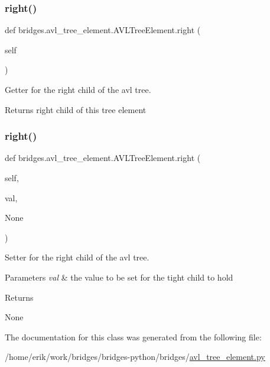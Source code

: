 \subsubsection{\texorpdfstring{right()}{right()}\hspace{0.1cm}{\footnotesize\ttfamily [1/2]}}
{\footnotesize\ttfamily def bridges.\+avl\+\_\+tree\+\_\+element.\+A\+V\+L\+Tree\+Element.\+right (\begin{DoxyParamCaption}\item[{}]{self }\end{DoxyParamCaption})}



Getter for the right child of the avl tree. 

\begin{DoxyReturn}{Returns}
right child of this tree element 
\end{DoxyReturn}
\mbox{\label{classbridges_1_1avl__tree__element_1_1_a_v_l_tree_element_ad9b5962ea5c89c9b91d7767b1b258c8e}} 
\subsubsection{\texorpdfstring{right()}{right()}\hspace{0.1cm}{\footnotesize\ttfamily [2/2]}}
{\footnotesize\ttfamily def bridges.\+avl\+\_\+tree\+\_\+element.\+A\+V\+L\+Tree\+Element.\+right (\begin{DoxyParamCaption}\item[{}]{self,  }\item[{}]{val,  }\item[{}]{None }\end{DoxyParamCaption})}



Setter for the right child of the avl tree. 


\begin{DoxyParams}{Parameters}
{\em val} & the value to be set for the tight child to hold \\
\hline
\end{DoxyParams}
\begin{DoxyReturn}{Returns}


None 
\end{DoxyReturn}


The documentation for this class was generated from the following file\+:\begin{DoxyCompactItemize}
\item 
/home/erik/work/bridges/bridges-\/python/bridges/\hyperlink{avl__tree__element_8py}{avl\+\_\+tree\+\_\+element.\+py}\end{DoxyCompactItemize}
